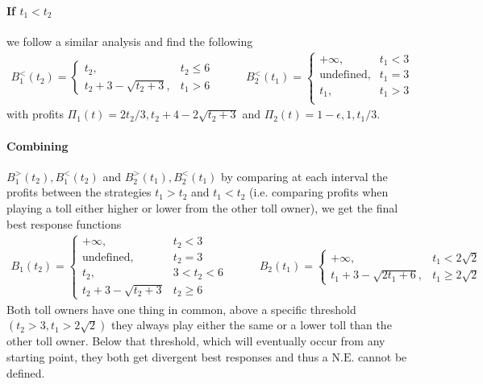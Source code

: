 \documentclass[a4paper,11pt]{article}
\newcommand{\NE}{\mathrm{N.E.}}
\begin{document}
\paragraph{If $t_1 < t_2$}
we follow a similar analysis and find the following
\begin{equation*}
	\begin{aligned}
		B_1^<(t_2) =
			\begin{cases}
				t_2, & t_2 \le 6 \\
				t_2 + 3 - \sqrt{t_2 + 3}, & t_1 > 6
			\end{cases}
	\end{aligned}
	\qquad
	\begin{aligned}
		B_2^<(t_1) =
			\begin{cases}
				+\infty, & t_1 < 3 \\
				\textrm{undefined}, & t_1 = 3 \\
				t_1, & t_1 > 3 \\
			\end{cases}
	\end{aligned}
\end{equation*}
with profits $\Pi_1(t) = {2 t_2}/3, t_2 + 4 - 2 \sqrt{t_2 + 3}$ and $\Pi_2(t) = 1 - \epsilon, 1, t_1/3$.

\paragraph{Combining} $B_1^>(t_2), B_1^<(t_2)$ and $B_2^>(t_1), B_2^<(t_1)$ by comparing at each interval the profits between the strategies $t_1 > t_2$ and $t_1 < t_2$ (i.e. comparing profits when playing a toll either higher or lower from the other toll owner), we get the final best response functions
\begin{equation*}
	\begin{aligned}
		B_1(t_2) =
			\begin{cases}
				+\infty, & t_2 < 3 \\
				\textrm{undefined}, & t_2 = 3 \\
				t_2, & 3 < t_2 < 6 \\
				t_2 + 3 - \sqrt{t_2 + 3} & t_2 \ge 6
			\end{cases}
	\end{aligned}
	\qquad
	\begin{aligned}
		B_2(t_1) =
			\begin{cases}
				+\infty, & t_1 < 2 \sqrt{2} \\
				t_1 + 3 - \sqrt{2 t_1 + 6}, & t_1 \ge 2 \sqrt{2}
			\end{cases}
	\end{aligned}
\end{equation*}
Both toll owners have one thing in common, above a specific threshold $(t_2 > 3, t_1 > 2 \sqrt{2})$ they always play either the same or a lower toll than the other toll owner.
Below that threshold, which will eventually occur from any starting point, they both get divergent best responses and thus a $\NE$ cannot be defined.
\end{document}
